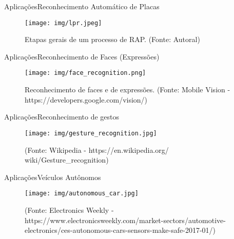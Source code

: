 \begin{frame}{Aplicações}{Reconhecimento Automático de Placas}

\begin{figure}
    \centering
    \texttt{[image: img/lpr.jpeg]}
    \caption{Etapas gerais de um processo de RAP. (Fonte: Autoral)}
    \label{fig:lpr_recognition}
\end{figure}

\end{frame}

\begin{frame}{Aplicações}{Reconhecimento de Faces (Expressões)}

\begin{figure}
    \centering
    \texttt{[image: img/face\_recognition.png]}
    \caption{Reconhecimento de faces e de expressões. (Fonte: Mobile Vision - https://developers.google.com/vision/)}
    \label{fig:face_recognition}
\end{figure}

\end{frame}

\begin{frame}{Aplicações}{Reconhecimento de gestos}

\begin{figure}
    \centering
    \texttt{[image: img/gesture\_recognition.jpg]}
    \caption{(Fonte: Wikipedia - https://en.wikipedia.org/ \\ wiki/Gesture\_recognition)}
    \label{fig:gesture_recognition}
\end{figure}

\end{frame}

\begin{frame}{Aplicações}{Veículos Autônomos}

\begin{figure}
    \centering
    \texttt{[image: img/autonomous\_car.jpg]}
    \caption{(Fonte: Electronics Weekly - https://www.electronicsweekly.com/market-sectors/automotive-electronics/ces-autonomous-cars-sensors-make-safe-2017-01/)}
    \label{fig:gesture_recognition}
\end{figure}

\end{frame}

